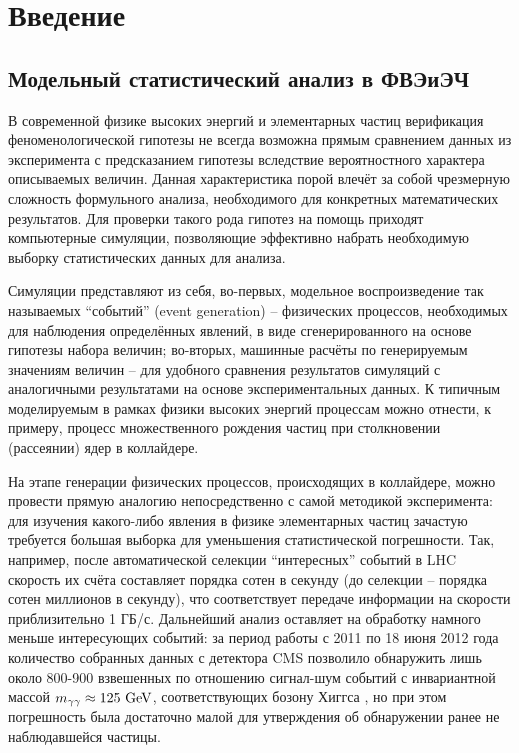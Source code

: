 \section{Введение}
\subsection{Модельный статистический анализ в ФВЭиЭЧ}
В современной физике высоких энергий и элементарных частиц верификация феноменологической гипотезы не всегда возможна прямым сравнением данных из эксперимента с предсказанием гипотезы вследствие вероятностного характера описываемых величин. 
Данная характеристика порой влечёт за собой чрезмерную сложность формульного анализа, необходимого для конкретных математических результатов. 
Для проверки такого рода гипотез на помощь приходят компьютерные симуляции, позволяющие эффективно набрать необходимую выборку статистических данных для анализа.

Симуляции представляют из себя, во-первых, модельное воспроизведение так называемых ``событий'' (event generation) -- физических процессов, необходимых для наблюдения определённых явлений, в виде сгенерированного на основе гипотезы набора величин; во-вторых, машинные расчёты по генерируемым значениям величин -- для удобного сравнения результатов симуляций с аналогичными результатами на основе экспериментальных данных\cite{EventGeneration}. 
К типичным моделируемым в рамках физики высоких энергий процессам можно отнести, к примеру, процесс множественного рождения частиц при столкновении (рассеянии) ядер в коллайдере.

На этапе генерации физических процессов, происходящих в коллайдере, можно провести прямую аналогию непосредственно с самой методикой эксперимента: для изучения какого-либо явления в физике элементарных частиц зачастую требуется большая выборка для уменьшения статистической погрешности. 
Так, например, после автоматической селекции ``интересных'' событий в LHC скорость их счёта составляет порядка сотен в секунду (до селекции -- порядка сотен миллионов в секунду), что соответствует передаче информации на скорости приблизительно 1 ГБ/с. 
Дальнейший анализ оставляет на обработку намного меньше интересующих событий: за период работы с 2011 по 18 июня 2012 года количество собранных данных с детектора CMS позволило обнаружить лишь около 800-900 взвешенных по отношению сигнал-шум событий с инвариантной массой $m_{\gamma \gamma} \approx 125 \textnormal{ GeV}$, соответствующих бозону Хиггса \cite{HiggsSt}, но при этом погрешность была достаточно малой для утверждения об обнаружении ранее не наблюдавшейся частицы.
